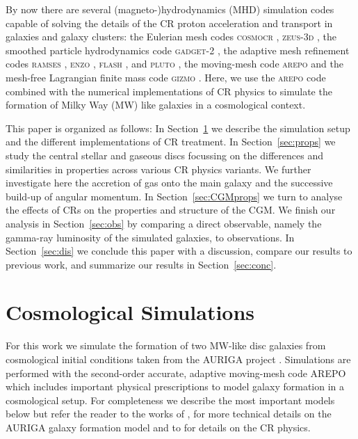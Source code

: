 \documentclass[useAMS,usenatbib]{mnras}
\newcommand{\Sec}[1]{Section~\ref{#1}}
\begin{document}
By now there are several (magneto-)hydrodynamics (MHD) simulation codes capable of solving the details of the CR proton acceleration and transport in galaxies
and galaxy clusters: 
the Eulerian mesh codes \textsc{cosmocr} \citep{Miniati2001}, \textsc{zeus-3d} \citep{Hanasz2003}, the smoothed particle hydrodynamics code \textsc{gadget-2}
\citep{Pfrommer2006,Ensslin2007,Jubelgas2008}, the adaptive mesh refinement codes \textsc{ramses} \citep{Booth2013, Dubois2016}, \textsc{enzo} \citep{Salem2014}, \textsc{flash} \citep{Girichidis2016}, and \textsc{pluto} \citep{Mignone2018}, the moving-mesh code \textsc{arepo} \citep{Pakmor2016b,Pfrommer2017} and the mesh-free Lagrangian finite mass code \textsc{gizmo} \citep{Chan2019}.  Here, we use the \textsc{arepo} code \citep{Springel2010,Pakmor2016c} combined with the numerical implementations of CR physics \citep{Pfrommer2017,Pakmor2016b} to simulate the formation of Milky Way (MW) like galaxies in a cosmological context. 

This paper is organized as follows: In \Sec{sec:sim} we describe the simulation setup and the different implementations of CR treatment. In \Sec{sec:props} we study the central stellar and gaseous discs focussing on the differences and similarities in properties across various CR physics variants. We further investigate here the accretion of gas onto the main galaxy and the successive build-up of angular momentum. In \Sec{sec:CGMprops} we turn to analyse the effects of CRs on the properties and structure of the CGM. We finish our analysis in \Sec{sec:obs} by comparing a direct observable, namely the gamma-ray luminosity of the simulated galaxies, to observations. In \Sec{sec:dis} we conclude this paper with a discussion, compare our results to previous work, and summarize our results in \Sec{sec:conc}.

\section{Cosmological Simulations} \label{sec:sim}


For this work we simulate the formation of two MW-like disc galaxies from cosmological initial conditions taken from the AURIGA project \citep{Grand2017,Grand2019}. Simulations are performed with the second-order accurate, adaptive moving-mesh code AREPO \citep{Springel2010,Pakmor2016c} which includes important physical prescriptions to model galaxy formation in a cosmological setup. For completeness we describe the most important models below but refer the reader to the works of \citet{Grand2017}, \citet{Pakmor2016b} for more technical details on the AURIGA galaxy formation model and to \citet{Pfrommer2017} for details on the CR physics.
\end{document}
